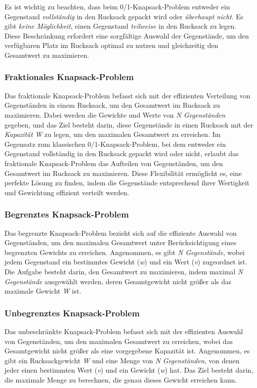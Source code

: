 Es ist wichtig zu beachten, dass beim 0/1-Knapsack-Problem entweder ein Gegenstand \textit{vollständig} in den Rucksack
gepackt wird oder \textit{überhaupt nicht}. Es gibt \textit{keine Möglichkeit}, einen Gegenstand \textit{teilweise} in
den Rucksack zu legen. Diese Beschränkung erfordert eine sorgfältige Auswahl der Gegenstände, um den verfügbaren Platz
im Rucksack optimal zu nutzen und gleichzeitig den Gesamtwert zu maximieren.

\subsubsection*{Fraktionales Knapsack-Problem}
Das fraktionale Knapsack-Problem befasst sich mit der effizienten Verteilung von Gegenständen in einem Rucksack, um den
Gesamtwert im Rucksack zu maximieren. Dabei werden die Gewichte und Werte von \textit{N Gegenständen} gegeben, und das
Ziel besteht darin, diese Gegenstände in einen Rucksack mit der \textit{Kapazität W} zu legen, um den maximalen Gesamtwert
zu erreichen. Im Gegensatz zum klassischen 0/1-Knapsack-Problem, bei dem entweder ein Gegenstand vollständig in den
Rucksack gepackt wird oder nicht, erlaubt das fraktionale Knapsack-Problem das Aufteilen von Gegenständen, um den Gesamtwert
im Rucksack zu maximieren. Diese Flexibilität ermöglicht es, eine perfekte Lösung zu finden, indem die Gegenstände
entsprechend ihrer Wertigkeit und Gewichtung effizient verteilt werden.

\subsubsection*{Begrenztes Knapsack-Problem}
Das begrenzte Knapsack-Problem bezieht sich auf die effiziente Auswahl von Gegenständen, um den maximalen Gesamtwert unter
Berücksichtigung eines begrenzten Gewichts zu erreichen. Angenommen, es gibt \textit{N Gegenstände}, wobei jedem Gegenstand
ein bestimmtes Gewicht (\textit{w}) und ein Wert (\textit{v}) zugeordnet ist. Die Aufgabe besteht darin, den Gesamtwert
zu maximieren, indem maximal \textit{N Gegenstände} ausgewählt werden, deren Gesamtgewicht nicht größer als das maximale
Gewicht \textit{W} ist.

\subsubsection*{Unbegrenztes Knapsack-Problem}
Das unbeschränkte Knapsack-Problem befasst sich mit der effizienten Auswahl von Gegenständen, um den maximalen Gesamtwert
zu erreichen, wobei das Gesamtgewicht nicht größer als eine vorgegebene Kapazität ist. Angenommen, es gibt ein
Rucksackgewicht \textit{W} und eine Menge von \textit{N Gegenständen}, von denen jeder einen bestimmten Wert (\textit{v})
und ein Gewicht (\textit{w}) hat. Das Ziel besteht darin, die maximale Menge zu berechnen, die genau dieses Gewicht
erreichen kann.

